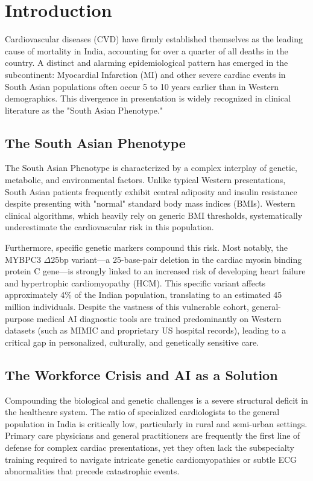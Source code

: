\documentclass[11pt,a4paper]{article}
\begin{document}
\newpage

\section{Introduction}

Cardiovascular diseases (CVD) have firmly established themselves as the leading cause of mortality in India, accounting for over a quarter of all deaths in the country. A distinct and alarming epidemiological pattern has emerged in the subcontinent: Myocardial Infarction (MI) and other severe cardiac events in South Asian populations often occur 5 to 10 years earlier than in Western demographics. This divergence in presentation is widely recognized in clinical literature as the "South Asian Phenotype."

\subsection{The South Asian Phenotype}
The South Asian Phenotype is characterized by a complex interplay of genetic, metabolic, and environmental factors. Unlike typical Western presentations, South Asian patients frequently exhibit central adiposity and insulin resistance despite presenting with "normal" standard body mass indices (BMIs). Western clinical algorithms, which heavily rely on generic BMI thresholds, systematically underestimate the cardiovascular risk in this population. 

Furthermore, specific genetic markers compound this risk. Most notably, the MYBPC3 $\Delta$25bp variant---a 25-base-pair deletion in the cardiac myosin binding protein C gene---is strongly linked to an increased risk of developing heart failure and hypertrophic cardiomyopathy (HCM). This specific variant affects approximately 4\% of the Indian population, translating to an estimated 45 million individuals. Despite the vastness of this vulnerable cohort, general-purpose medical AI diagnostic tools are trained predominantly on Western datasets (such as MIMIC and proprietary US hospital records), leading to a critical gap in personalized, culturally, and genetically sensitive care.

\subsection{The Workforce Crisis and AI as a Solution}
Compounding the biological and genetic challenges is a severe structural deficit in the healthcare system. The ratio of specialized cardiologists to the general population in India is critically low, particularly in rural and semi-urban settings. Primary care physicians and general practitioners are frequently the first line of defense for complex cardiac presentations, yet they often lack the subspecialty training required to navigate intricate genetic cardiomyopathies or subtle ECG abnormalities that precede catastrophic events.
\end{document}
